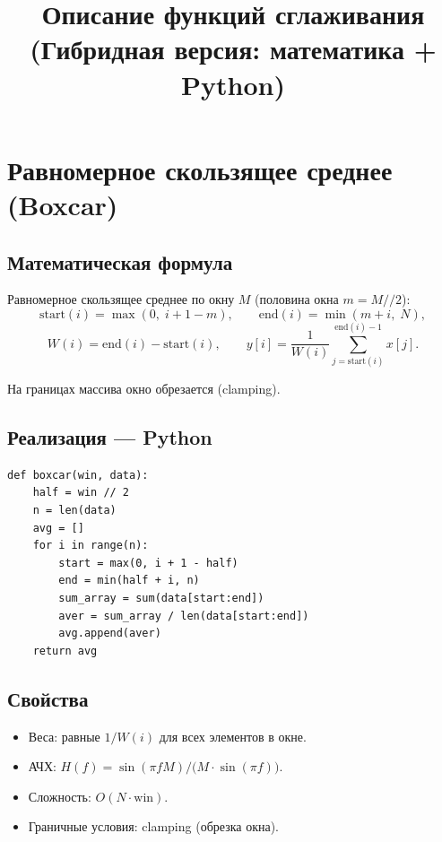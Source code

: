 \documentclass[12pt,a4paper]{article}
\title{\color{titleblue}\textbf{Описание функций сглаживания\\(Гибридная версия: математика + Python)}}
\author{}
\date{}
\begin{document}
\maketitle

\section{Равномерное скользящее среднее (Boxcar)}

\subsection{Математическая формула}

Равномерное скользящее среднее по окну $M$ (половина окна $m = M // 2$):
\[
\text{start}(i) = \max(0,\; i + 1 - m), \qquad
\text{end}(i) = \min(m + i, \; N),
\]
\[
W(i) = \text{end}(i) - \text{start}(i), \qquad
y[i] = \frac{1}{W(i)} \sum_{j = \text{start}(i)}^{\text{end}(i) - 1} x[j].
\]

На границах массива окно обрезается (clamping).

\subsection{Реализация --- Python}

\begin{lstlisting}
def boxcar(win, data):
    half = win // 2
    n = len(data)
    avg = []
    for i in range(n):
        start = max(0, i + 1 - half)
        end = min(half + i, n)
        sum_array = sum(data[start:end])
        aver = sum_array / len(data[start:end])
        avg.append(aver)
    return avg
\end{lstlisting}

\subsection{Свойства}

\begin{itemize}
  \item Веса: равные $1/W(i)$ для всех элементов в окне.
  \item АЧХ: $H(f) = \sin(\pi f M) \big/ \bigl(M \cdot \sin(\pi f)\bigr)$.
  \item Сложность: $O(N \cdot \text{win})$.
  \item Граничные условия: clamping (обрезка окна).
\end{itemize}

\end{document}

